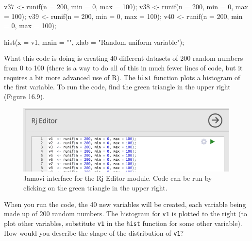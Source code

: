 \documentclass[
]{scrbook}
\newenvironment{Shaded}{\begin{snugshade}}{\end{snugshade}}
\newcommand{\AttributeTok}[1]{\textcolor[rgb]{0.77,0.63,0.00}{#1}}
\newcommand{\DecValTok}[1]{\textcolor[rgb]{0.00,0.00,0.81}{#1}}
\newcommand{\FunctionTok}[1]{\textcolor[rgb]{0.00,0.00,0.00}{#1}}
\newcommand{\NormalTok}[1]{#1}
\newcommand{\OtherTok}[1]{\textcolor[rgb]{0.56,0.35,0.01}{#1}}
\newcommand{\StringTok}[1]{\textcolor[rgb]{0.31,0.60,0.02}{#1}}
\begin{document}
\begin{Shaded}
\begin{Highlighting}[]
\NormalTok{v37 }\OtherTok{\textless{}{-}} \FunctionTok{runif}\NormalTok{(}\AttributeTok{n =} \DecValTok{200}\NormalTok{, }\AttributeTok{min =} \DecValTok{0}\NormalTok{, }\AttributeTok{max =} \DecValTok{100}\NormalTok{);}
\NormalTok{v38 }\OtherTok{\textless{}{-}} \FunctionTok{runif}\NormalTok{(}\AttributeTok{n =} \DecValTok{200}\NormalTok{, }\AttributeTok{min =} \DecValTok{0}\NormalTok{, }\AttributeTok{max =} \DecValTok{100}\NormalTok{);}
\NormalTok{v39 }\OtherTok{\textless{}{-}} \FunctionTok{runif}\NormalTok{(}\AttributeTok{n =} \DecValTok{200}\NormalTok{, }\AttributeTok{min =} \DecValTok{0}\NormalTok{, }\AttributeTok{max =} \DecValTok{100}\NormalTok{);}
\NormalTok{v40 }\OtherTok{\textless{}{-}} \FunctionTok{runif}\NormalTok{(}\AttributeTok{n =} \DecValTok{200}\NormalTok{, }\AttributeTok{min =} \DecValTok{0}\NormalTok{, }\AttributeTok{max =} \DecValTok{100}\NormalTok{);}

\FunctionTok{hist}\NormalTok{(}\AttributeTok{x =}\NormalTok{ v1, }\AttributeTok{main =} \StringTok{""}\NormalTok{, }\AttributeTok{xlab =} \StringTok{"Random uniform variable"}\NormalTok{);}
\end{Highlighting}
\end{Shaded}

What this code is doing is creating 40 different datasets of 200 random numbers from 0 to 100 (there is a way to do all of this in much fewer lines of code, but it requires a bit more advanced use of R).
The \texttt{hist} function plots a histogram of the first variable.
To run the code, find the green triangle in the upper right (Figure 16.9).

\begin{figure}
\includegraphics[width=0.8\linewidth]{img/jamovi_RjEditor} \caption{Jamovi interface for the Rj Editor module. Code can be run by clicking on the green triangle in the upper right.}\label{fig:unnamed-chunk-75}
\end{figure}

When you run the code, the 40 new variables will be created, each variable being made up of 200 random numbers.
The histogram for \texttt{v1} is plotted to the right (to plot other variables, substitute \texttt{v1} in the \texttt{hist} function for some other variable).
How would you describe the shape of the distribution of \texttt{v1}?
\end{document}
